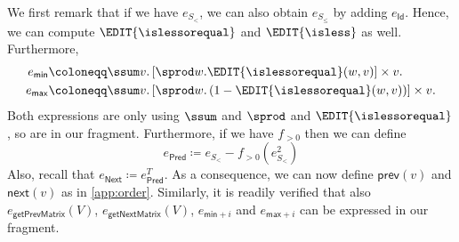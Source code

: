 We first remark that if we have $e_{S_{<}}$, we can also obtain
 $e_{S_{\leq}}$ by adding $e_{\mathsf{Id}}$. Hence,
%
%
we can compute $\EDIT{\islessorequal}$ and $\EDIT{\isless}$ as well. Furthermore, 
\begin{align*}
  e_{\mathsf{min}}&\coloneqq \ssum v. \left[ \sprod w. \EDIT{\islessorequal}(w,v)\right] \times v. \\
  e_{\mathsf{max}}&\coloneqq \ssum v. \left[ \sprod w. \left( 1-\EDIT{\islessorequal}(w,v) \right) \right] \times v.
\end{align*}
Both expressions are only using $\ssum$ and $\sprod$ and $\EDIT{\islessorequal}$, so are in our fragment.
Furthermore, if we have $f_{>0}$ then we can define
$$
e_{\mathsf{Pred}}\coloneqq  e_{S_{<}}- f_{>0}(e_{S_{<}}^2)
$$
Also, recall that  $e_{\mathsf{Next}}\coloneqq e_{\mathsf{Pred}}^T$. As a consequence, 
we can now define $\mathsf{prev}(v)$ and $\mathsf{next}(v)$ as in \ref{app:order}. Similarly,
it is readily verified that also $e_{\mathsf{getPrevMatrix}}(V)$,
$e_{\mathsf{getNextMatrix}}(V)$, $e_{\mathsf{min}+i}$ and $e_{\mathsf{max}+i}$ can be expressed
in our fragment.



